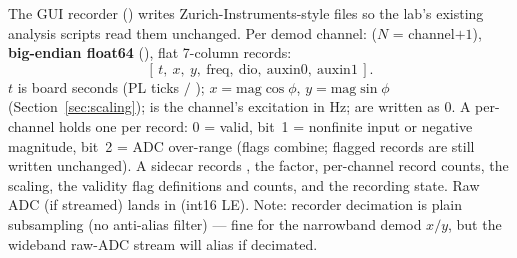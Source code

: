 The GUI recorder () writes Zurich-Instruments-style
files so the lab's existing analysis scripts read them unchanged. Per demod
channel:  ($N$ = channel$+1$),
\textbf{big-endian float64} (), flat 7-column records:
\[
[\,t,\ x,\ y,\ \text{freq},\ \text{dio},\ \text{auxin0},\ \text{auxin1}\,].
\]
$t$ is board seconds (PL ticks $/$ ); $x=\text{mag}\cos\phi$,
$y=\text{mag}\sin\phi$ (Section~\ref{sec:scaling});  is the channel's
excitation in Hz;  are written as 0. A per-channel
 holds one  per record: 0 = valid,
bit~1 = nonfinite input or negative magnitude, bit~2 = ADC over-range (flags
combine; flagged records are still written unchanged). A 
sidecar records , the  factor,
per-channel record counts, the scaling, the validity flag definitions and
counts, and the recording state. Raw ADC (if streamed) lands in
 (int16 LE). Note: recorder decimation is plain subsampling
(no anti-alias filter) --- fine for the narrowband demod $x/y$, but the wideband
raw-ADC stream will alias if decimated.

